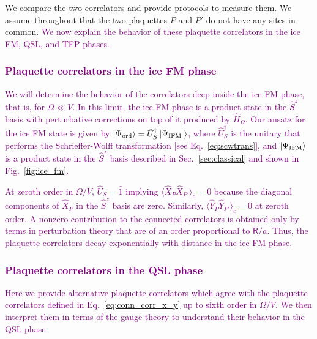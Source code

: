 \documentclass[twocolumn,superscriptaddress,amsmath,amssymb,aps,prx,nofootinbib]{revtex4-2}
\newcommand{\newtext}[1]{\textcolor{purple}{#1}}
\begin{document}
We compare the two correlators and provide protocols to measure them.
We assume throughout that the two plaquettes $P$ and $P'$ do not have any sites in common. 
\newtext{We now explain the behavior of these plaquette correlators in the ice FM, QSL, and TFP phases.}

\newtext{\subsubsection{Plaquette correlators in the ice FM phase}}

\newtext{We will determine the behavior of the correlators deep inside the ice FM phase, that is, for $\Omega \ll V$. In this limit, the ice FM phase is a product state in the $\hat{S}^z$ basis with perturbative corrections on top of it produced by $\hat{H}_\Omega$. Our ansatz for the ice FM state is given by $\ket{\Psi_{\text{ord}}}=\hat{U}_S^{\dagger}\ket{\Psi_{\text{IFM }}}$, where $\hat{U}_S^\dagger$ is the unitary that performs the Schrieffer-Wolff transformation [see Eq.~\eqref{eq:scwtrans}], and $\ket{\Psi_\text{IFM}}$ is a product state in the $\hat{S}^z$ basis described in Sec.~\ref{sec:classical} and shown in Fig.~\ref{fig:ice_fm}.}

\newtext{At zeroth order in $\Omega/V$, $\hat{U}_S = \hat{1}$ implying $\langle \hat{X}_P \hat{X}_{P'} \rangle_c = 0$ because the diagonal components of $\hat{X}_{P}$ in the $\hat{S}^z$ basis are zero. Similarly, $\langle \hat{Y}_P \hat{Y}_{P'} \rangle_c =0 $ at zeroth order. A nonzero contribution to the connected correlators is obtained only by terms in perturbation theory that are of an order proportional to $\mathsf{R}/a$. Thus, the plaquette correlators decay exponentially with distance in the ice FM phase. }\\

\newtext{\subsubsection{Plaquette correlators in the QSL phase}}

\newtext{Here we provide alternative plaquette correlators which agree with the plaquette correlators defined in Eq.~\eqref{eq:conn_corr_x_y} up to sixth order in $\Omega/V$. We then interpret them in terms of the gauge theory to understand their behavior in the QSL phase. }
\end{document}
